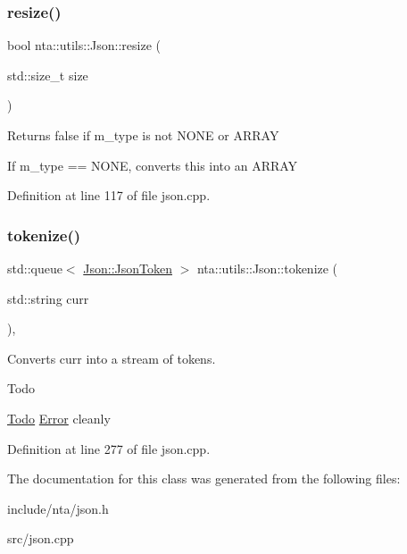 \subsubsection{\texorpdfstring{resize()}{resize()}}
{\footnotesize\ttfamily bool nta\+::utils\+::\+Json\+::resize (\begin{DoxyParamCaption}\item[{std\+::size\+\_\+t}]{size }\end{DoxyParamCaption})}

Returns false if m\+\_\+type is not N\+O\+NE or A\+R\+R\+AY

If m\+\_\+type == N\+O\+NE, converts this into an A\+R\+R\+AY 

Definition at line 117 of file json.\+cpp.

\mbox{\label{classnta_1_1utils_1_1Json_a905d67b125a7aadd771bb74a1bb63f34}} 
\subsubsection{\texorpdfstring{tokenize()}{tokenize()}}
{\footnotesize\ttfamily std\+::queue$<$ \hyperlink{structnta_1_1utils_1_1Json_1_1JsonToken}{Json\+::\+Json\+Token} $>$ nta\+::utils\+::\+Json\+::tokenize (\begin{DoxyParamCaption}\item[{std\+::string}]{curr }\end{DoxyParamCaption})\hspace{0.3cm}{\ttfamily [static]}, {\ttfamily [private]}}



Converts curr into a stream of tokens. 

\begin{DoxyRefDesc}{Todo}
\item[\hyperlink{todo__todo000024}{Todo}]\hyperlink{structnta_1_1Error}{Error} cleanly \end{DoxyRefDesc}


Definition at line 277 of file json.\+cpp.



The documentation for this class was generated from the following files\+:\begin{DoxyCompactItemize}
\item 
include/nta/json.\+h\item 
src/json.\+cpp\end{DoxyCompactItemize}
